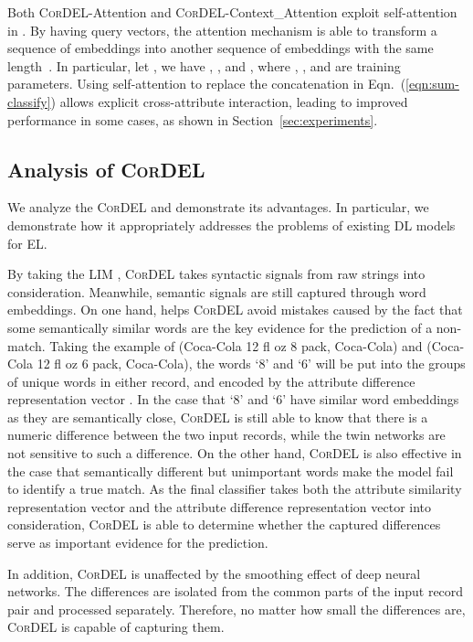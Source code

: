 \documentclass[conference]{IEEEtran}
\begin{document}
Both \textsc{CorDEL}-Attention and \textsc{CorDEL}-Context\_Attention exploit self-attention~\cite{vaswani2017attention,devlin2019bert} in . By having  query vectors, the attention mechanism is able to transform a sequence of embeddings into another sequence of embeddings with the same length~\cite{vaswani2017attention,devlin2019bert}. In particular, let , we have , , and , where , , and  are training parameters. Using self-attention to replace the concatenation in Eqn.~(\ref{eqn:sum-classify}) allows explicit cross-attribute interaction, leading to improved performance in some cases, as shown in Section~\ref{sec:experiments}.

\subsection{Analysis of \textsc{CorDEL}}\label{sec:pros}

We analyze the \textsc{CorDEL} and demonstrate its advantages. In particular, we demonstrate how it appropriately addresses the problems of existing DL models for EL.

By taking the LIM , \textsc{CorDEL} takes syntactic signals from raw strings into consideration. Meanwhile, semantic signals are still captured through word embeddings. On one hand,  helps \textsc{CorDEL} avoid mistakes caused by the fact that some semantically similar words are the key evidence for the prediction of a non-match. Taking the example of (Coca-Cola 12 fl oz 8 pack, Coca-Cola) and (Coca-Cola 12 fl oz 6 pack, Coca-Cola), the words `8' and `6' will be put into the groups of unique words in either record, and encoded by the attribute difference representation vector . In the case that `8' and `6' have similar word embeddings as they are semantically close, \textsc{CorDEL} is still able to know that there is a numeric difference between the two input records, while the twin networks are not sensitive to such a difference. On the other hand, \textsc{CorDEL} is also effective in the case that semantically different but unimportant words make the model fail to identify a true match. As the final classifier takes both the attribute similarity representation vector  and the attribute difference representation vector  into consideration, \textsc{CorDEL} is able to determine whether the captured differences serve as important evidence for the prediction.

In addition, \textsc{CorDEL} is unaffected by the smoothing effect of deep neural networks. The differences are isolated from the common parts of the input record pair and processed separately. Therefore, no matter how small the differences are, \textsc{CorDEL} is capable of capturing them.
\end{document}
